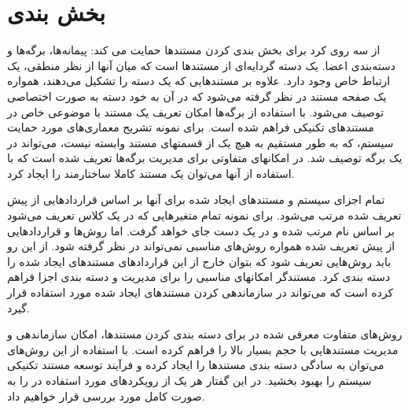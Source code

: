 %
% 
% 
% 
%

\chapter{بخش بندی}

 از سه روی کرد برای بخش بندی کردن مستندها حمایت می کند:
پیمانه‌ها، برگه‌ها و دسته‌بندی اعضا.
 یک دسته گردایه‌ای از مستندها است که میان آنها از نظر منطقی، یک ارتباط خاص وجود
 دارد. علاوه بر مستندهایی که یک دسته را تشکیل می‌دهند، همواره یک صفحه مستند در
 نظر گرفته می‌شود که در آن به خود دسته به صورت اختصاصی توصیف می‌شود.
 با استفاده از برگه‌ها امکان تعریف یک مستند با موضوعی خاص در مستندهای تکنیکی
 فراهم شده است. برای نمونه تشریح معماری‌های مورد حمایت سیستم، که به طور مستقیم
 به هیچ یک از قسمتهای مستند وابسته نیست، می‌تواند در یک برگه توصیف شد. در
  امکانهای متفاوتی برای مدیریت برگه‌ها تعریف شده است که با استفاده
 از آنها می‌توان یک مستند کاملا ساختارمند را ایجاد کرد.
 
 تمام اجزای سیستم و مستند‌های ایجاد شده برای آنها بر اساس قراردادهایی از پیش
 تعریف شده مرتب می‌شود. برای نمونه تمام متغیرهایی که در یک کلاس تعریف می‌شود بر
 اساس نام مرتب شده و در یک دست جای خواهد گرفت. اما روش‌ها و قراردادهایی از پیش
 تعریف شده همواره روش‌های مناسبی نمی‌تواند در نظر گرفته شود. از این رو باید
 روش‌هایی تعریف شود که بتوان خارج از این قراردادهای مستندهای ایجاد شده را دسته
 بندی کرد. مستندگر  امکانهای مناسبی را برای مدیریت و دسته بندی اجزا
 فراهم کرده است که می‌تواند در سازماندهی کردن مستندهای ایجاد شده مورد استفاده
 قرار گیرد.
 
روش‌های متفاوت معرفی شده در  برای دسته بندی کردن مستند‌ها، امکان
سازماندهی و مدیریت مستندهایی با حجم بسیار بالا را فراهم کرده است. با استفاده از
این روش‌های می‌توان به سادگی دسته بندی مستندها را ایجاد کرده و فرآیند توسعه
مستند تکنیکی سیستم را بهبود بخشید. در این گفتار هر یک از رویکردهای مورد استفاده
در  را به صورت کامل مورد بررسی قرار خواهیم داد.





